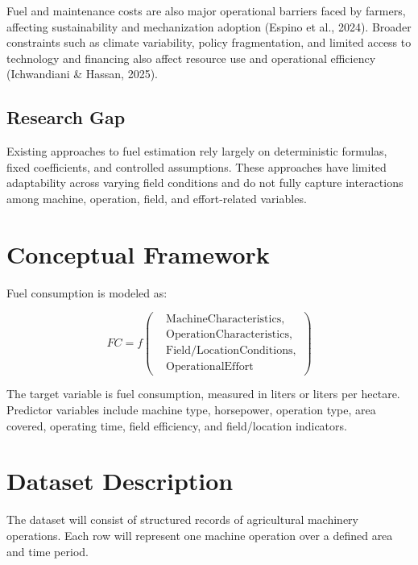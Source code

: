 \documentclass[11pt,twocolumn]{article}
\begin{document}
\vspace{10pt}

Fuel and maintenance costs are also major operational barriers faced by farmers, affecting sustainability and mechanization adoption (Espino et al., 2024). Broader constraints such as climate variability, policy fragmentation, and limited access to technology and financing also affect resource use and operational efficiency (Ichwandiani \& Hassan, 2025).

\subsection*{Research Gap}

Existing approaches to fuel estimation rely largely on deterministic formulas, fixed coefficients, and controlled assumptions. These approaches have limited adaptability across varying field conditions and do not fully capture interactions among machine, operation, field, and effort-related variables.

\section*{Conceptual Framework}

Fuel consumption is modeled as:

\[
FC = f\left(
\begin{aligned}
&\mathrm{Machine Characteristics},\\
&\mathrm{Operation Characteristics},\\
&\mathrm{Field/Location Conditions},\\
&\mathrm{Operational Effort}
\end{aligned}
\right)
\]

The target variable is fuel consumption, measured in liters or liters per hectare. Predictor variables include machine type, horsepower, operation type, area covered, operating time, field efficiency, and field/location indicators.

\section*{Dataset Description}

The dataset will consist of structured records of agricultural machinery operations. Each row will represent one machine operation over a defined area and time period.

\vspace{10pt}
\end{document}
